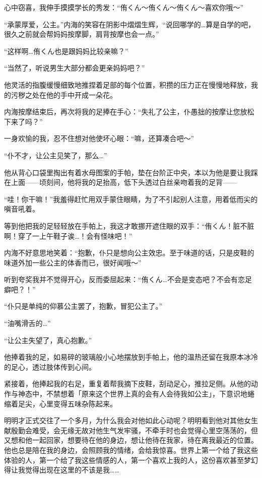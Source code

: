 心中窃喜，我伸手摸摸学长的秀发：“侑くん～侑くん～侑くん～喜欢你哦～”

“承蒙厚爱，公主。”内海的笑容在阴影中熠熠生辉，“说回哪学的…算是自学的吧，很久之前就会帮妈妈按摩脚，肩背按摩也会一点。”

“这样啊…侑くん也是跟妈妈比较亲嘛？”

“当然了，听说男生大部分都会更亲妈妈吧？”

他灵活的指腹缓慢细致地推捏着足部的每个位置，积攒的压力正在慢慢地释放，我的污秽之处在他的手中开成一朵花。

内海按摩结束后，再次将我的足捧在手心：“失礼了公主，仆愚拙的按摩让您放松下来了吗？”

一身欢愉的我，忍不住想对他使坏心眼：“嘛，还算凑合吧～”

“仆不才，让公主见笑了，那么…”

他从背心口袋里掏出有着水母图案的手帕，垫在台阶正中央，本以为他是要让我踩在上面——顷刻间，他将我的足抬高，低下头透过白丝亲吻着我的足背——

“哇！你干嘛！”我羞得赶忙用双手蒙住眼睛，为了不引起别人注意，用着低而尖的嗔音吼着。

等到他把我的足轻轻放在手帕上，我这才敢挪开遮住眼的双手：“侑くん！脏不脏啊！穿了一上午鞋子诶…！会有怪味吧！”

内海不好意思地笑着：“抱歉，仆只是想向公主效忠。至于味道的话，只是皮鞋的味道外加一些公主的体香而已，很好闻哦～”

听到夸奖我并不觉得开心，反而委屈起来：“侑くん…不会是变态吧？不会有恋足癖吧？！”

“仆只是单纯的仰慕公主罢了，抱歉，冒犯公主了。”

“油嘴滑舌的…”

“让公主失望了，真心抱歉。”

他捧着我的足，如易碎的玻璃般小心地摆放到手帕上，他的温热还留在我原本冰冷的足心，透过肢体传到心间。

紧接着，他捧起我的右足，重复着帮我摘下皮鞋，刮动足心，推拉足侧。从他的动作与神态中，不禁想着「原来这个世界上真的会有人会待我如公主」，下意识地蜷缩着足尖，心里变得五味杂陈起来。

\newday{\love\cloudy}

明明才正式交往了一个多月，为什么我会对他如此心动呢？明明看到他对其他女生献殷勤会难受，会无缘无故对他生气发牢骚，不牵手时也会觉得心里空荡荡的，但又想和他一起回家，想要待在他的身边，想让他待在我家，待在离我最近的位置。他也总是陪在我的身边，会照顾我的情绪，会给我惊喜。世界上第一个给了我这些体验的人，第一个给了我这些情感的人，第一个喜欢上我的人，这份喜欢甚至梦幻得让我觉得出现在这里的不该是我……

